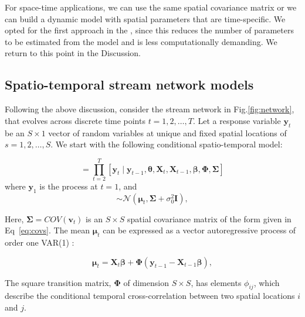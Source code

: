 For space-time applications, we can use the same spatial covariance matrix or we can build a dynamic model with spatial parameters that are time-specific. We opted for the first approach in the , since this reduces the number of parameters to be estimated from the model and is less computationally demanding. We return to this point in the Discussion.


\subsection{Spatio-temporal stream network models}

Following the above discussion, consider the stream network in Fig.\ref{fig:network}, that evolves across discrete time points $t = 1, 2, \ldots, T$.
Let a response variable $\pmb{y}_t$ be an $S \times 1$ vector of random variables at unique and fixed spatial locations of $s = 1, 2, \ldots, S$. 
We start with the following conditional spatio-temporal model:

\begin{equation}
[\pmb{y}_1,\pmb{y}_2,\cdots,\pmb{y}_T] =  \prod_{t=2}^{T}[\pmb{y}_t \mid  \pmb{y}_{t-1}, \pmb{\theta},\pmb{X}_{t},\pmb{X}_{t-1},\pmb{\beta}, \pmb{\Phi}, \pmb{\Sigma}]%
\label{eq:VAR1def}
\end{equation}
where $\pmb{y}_1$ is the process at $t=1$, and
\begin{equation}
[\pmb{y}_t \mid  \pmb{y}_{t-1},\pmb{\theta},\pmb{X}_{t},\pmb{X}_{t-1},\pmb{\beta}, \pmb{\Phi}, \pmb{\Sigma}  ] \sim \mathcal{N}(\pmb{\mu}_{t},\pmb{\Sigma} + \sigma^2_0\pmb{I}), 
\end{equation}

\noindent Here, $\pmb{\Sigma} = COV(\pmb{v}_t)$ is an $S \times S$ spatial covariance matrix of the form given in Eq~\ref{eq:covs}.
The mean $\pmb{\mu}_{t}$ can be expressed as a vector autoregressive process of order one VAR(1) \citep{hamilton1994time}:

\begin{equation}
\pmb{\mu}_{t} = \pmb{X}_{t}\pmb{\beta} + \pmb{\Phi} (\pmb{y}_{t-1} - \pmb{X}_{t-1}\pmb{\beta}),
\label{eq:err_}
\end{equation}

\noindent The square transition matrix, $\pmb{\Phi}$ of dimension $S \times S$, has elements $\phi_{ij}$, which describe the conditional temporal cross-correlation between two spatial locations $i$ and $j$. 



